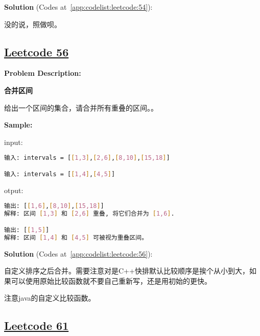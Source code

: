 \textbf{Solution }(Codes at~\ref{app:codelist:leetcode:54}):\par

没的说，照做呗。\par



\subsection{\href{https://leetcode-cn.com/}{Leetcode 56}}\label{app:problemlist:leetcode:56}

\textbf{Problem Description:}\par

\textbf{合并区间}\par

给出一个区间的集合，请合并所有重叠的区间。。\par


\textbf{Sample:}\par

input:\par

\begin{lstlisting}[language=bash]
输入: intervals = [[1,3],[2,6],[8,10],[15,18]]

输入: intervals = [[1,4],[4,5]]
\end{lstlisting}

otput:\par

\begin{lstlisting}[language=bash]
输出: [[1,6],[8,10],[15,18]]
解释: 区间 [1,3] 和 [2,6] 重叠, 将它们合并为 [1,6].

输出: [[1,5]]
解释: 区间 [1,4] 和 [4,5] 可被视为重叠区间。
\end{lstlisting}

\textbf{Solution }(Codes at~\ref{app:codelist:leetcode:56}):\par

自定义排序之后合并。需要注意对是C++快排默认比较顺序是挨个从小到大，如果可以使用原始比较函数就不要自己重新写，还是用初始的更快。\par

注意java的自定义比较函数。\par



\subsection{\href{https://leetcode-cn.com/}{Leetcode 61}}\label{app:problemlist:leetcode:61}

